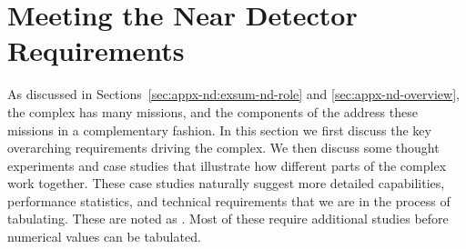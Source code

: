 


\section{Meeting the Near Detector Requirements}
\label{sec:appx-nd:requirements}

As discussed in Sections~\ref{sec:appx-nd:exsum-nd-role} and \ref{sec:appx-nd-overview}, the    complex has many missions, and the components of the    address these missions in a complementary fashion. In this section we first discuss the key overarching requirements driving the  complex. We then discuss some thought experiments and case studies that illustrate how different parts of the complex work together. These case studies naturally suggest more detailed capabilities, performance statistics, and technical requirements that we are in the process of tabulating. These are noted as . Most of these require additional studies before numerical values can be tabulated.




